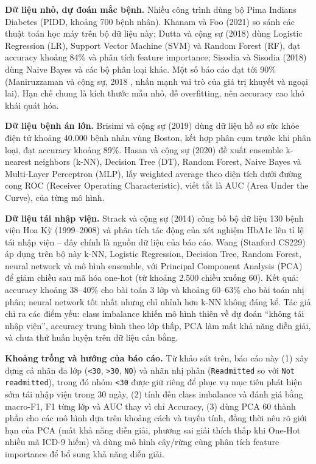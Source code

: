 \documentclass[a4paper]{report}
\begin{document}
\textbf{Dữ liệu nhỏ, dự đoán mắc bệnh.} Nhiều công trình dùng bộ Pima Indians Diabetes (PIDD, khoảng 700 bệnh nhân). Khanam và Foo (2021) \cite{tl1} so sánh các thuật toán học máy trên bộ dữ liệu này; Dutta và cộng sự (2018) \cite{tl4} dùng Logistic Regression (LR), Support Vector Machine (SVM) và Random Forest (RF), đạt accuracy khoảng 84\% và phân tích feature importance; Sisodia và Sisodia (2018) \cite{tl5} dùng Naive Bayes và các bộ phân loại khác. Một số báo cáo đạt tới 90\% (Maniruzzaman và cộng sự, 2018 \cite{tl2}, nhấn mạnh vai trò của giá trị khuyết và ngoại lai). Hạn chế chung là kích thước mẫu nhỏ, dễ overfitting, nên accuracy cao khó khái quát hóa.

\textbf{Dữ liệu bệnh án lớn.} Brisimi và cộng sự (2019) \cite{tl3} dùng dữ liệu hồ sơ sức khỏe điện tử khoảng 40.000 bệnh nhân vùng Boston, kết hợp phân cụm trước khi phân loại, đạt accuracy khoảng 89\%. Hasan và cộng sự (2020) \cite{tl6} đề xuất ensemble k-nearest neighbors (k-NN), Decision Tree (DT), Random Forest, Naive Bayes và Multi-Layer Perceptron (MLP), lấy weighted average theo diện tích dưới đường cong ROC (Receiver Operating Characteristic), viết tắt là AUC (Area Under the Curve), của từng mô hình.

\textbf{Dữ liệu tái nhập viện.} Strack và cộng sự (2014) \cite{tl7} công bố bộ dữ liệu 130 bệnh viện Hoa Kỳ (1999–2008) và phân tích tác động của xét nghiệm HbA1c lên tỉ lệ tái nhập viện – đây chính là nguồn dữ liệu của báo cáo. Wang (Stanford CS229) \cite{tl8} áp dụng trên bộ này k-NN, Logistic Regression, Decision Tree, Random Forest, neural network và mô hình ensemble, với Principal Component Analysis (PCA) để giảm chiều sau mã hóa one-hot (từ khoảng 2.500 chiều xuống 60). Kết quả: accuracy khoảng 38–40\% cho bài toán 3 lớp và khoảng 60–63\% cho bài toán nhị phân; neural network tốt nhất nhưng chỉ nhỉnh hơn k-NN không đáng kể. Tác giả chỉ ra các điểm yếu: class imbalance khiến mô hình thiên về dự đoán “không tái nhập viện”, accuracy trung bình theo lớp thấp, PCA làm mất khả năng diễn giải, và chưa thử huấn luyện trên dữ liệu cân bằng.

\textbf{Khoảng trống và hướng của báo cáo.} Từ khảo sát trên, báo cáo này (1) xây dựng cả nhãn đa lớp (\texttt{<30}, \texttt{>30}, \texttt{NO}) và nhãn nhị phân (\texttt{Readmitted} so với \texttt{Not readmitted}), trong đó nhóm \texttt{<30} được giữ riêng để phục vụ mục tiêu phát hiện sớm tái nhập viện trong 30 ngày, (2) tính đến class imbalance và đánh giá bằng macro-F1, F1 từng lớp và AUC thay vì chỉ Accuracy, (3) dùng PCA 60 thành phần cho các mô hình dựa trên khoảng cách và tuyến tính, đồng thời nêu rõ giới hạn của PCA (mất khả năng diễn giải, phương sai giải thích thấp khi One-Hot nhiều mã ICD-9 hiếm) và dùng mô hình cây/rừng cùng phân tích feature importance để bổ sung khả năng diễn giải.
\end{document}
